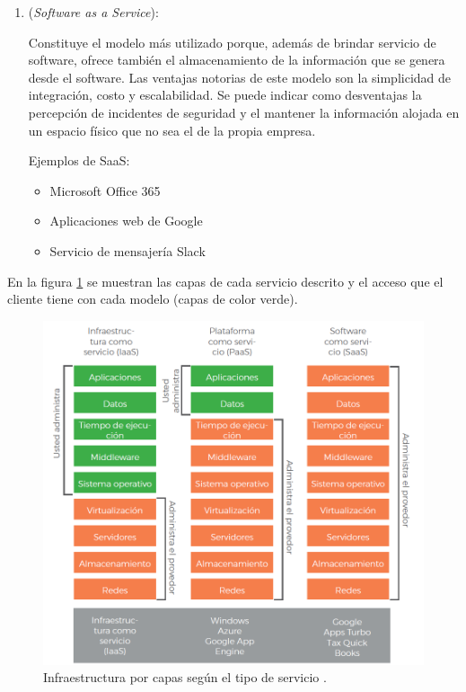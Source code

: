 \begin{enumerate}
\vspace{0.5cm}

\item {} (\emph{Software as a Service}): 

Constituye el modelo más utilizado porque, además de brindar servicio de software, ofrece también el almacenamiento de la información que se genera desde el software. Las ventajas notorias de este modelo son la simplicidad de integración, costo y escalabilidad. Se puede indicar como desventajas la percepción de incidentes de seguridad y el mantener la información alojada en un espacio físico que no sea el de la propia empresa. 

Ejemplos de SaaS:

\begin{itemize}
\item Microsoft Office 365
\item Aplicaciones web de Google
\item Servicio de mensajería Slack
\end{itemize}

\vspace{0.5cm}

\end{enumerate}

En la figura \ref{fig:capas-servicios} se muestran las capas de cada servicio descrito y el acceso que el cliente tiene con cada modelo (capas de color verde).

\begin{figure}[htbp]
	\centering
	\includegraphics[width=.8\textwidth]{./Figures/capas-servicios.png}
	\caption{Infraestructura por capas según el tipo de servicio  \protect\footnotemark.}

	\label{fig:capas-servicios}
\end{figure}

